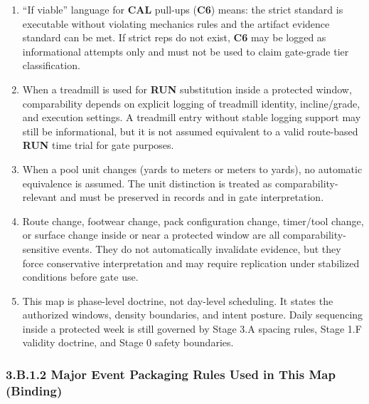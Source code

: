 \documentclass[10pt]{article}
\begin{document}
\begin{enumerate}
\item “If viable” language for \textbf{CAL} pull-ups (\textbf{C6}) means: the strict standard is executable without violating mechanics rules and the artifact evidence standard can be met. If strict reps do not exist, \textbf{C6} may be logged as informational attempts only and must not be used to claim gate-grade tier classification.

\item When a treadmill is used for \textbf{RUN} substitution inside a protected window, comparability depends on explicit logging of treadmill identity, incline/grade, and execution settings. A treadmill entry without stable logging support may still be informational, but it is not assumed equivalent to a valid route-based \textbf{RUN} time trial for gate purposes.

\item When a pool unit changes (yards to meters or meters to yards), no automatic equivalence is assumed. The unit distinction is treated as comparability-relevant and must be preserved in records and in gate interpretation.

\item Route change, footwear change, pack configuration change, timer/tool change, or surface change inside or near a protected window are all comparability-sensitive events. They do not automatically invalidate evidence, but they force conservative interpretation and may require replication under stabilized conditions before gate use.

\item This map is phase-level doctrine, not day-level scheduling. It states the authorized windows, density boundaries, and intent posture. Daily sequencing inside a protected week is still governed by Stage 3.A spacing rules, Stage 1.F validity doctrine, and Stage 0 safety boundaries.
\end{enumerate}

\subsubsection*{3.B.1.2 Major Event Packaging Rules Used in This Map (Binding)}
\end{document}
